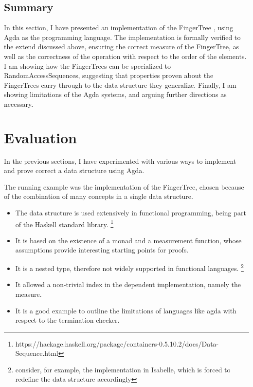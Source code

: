 \documentclass[12pt,twoside,notitlepage]{report}
\begin{document}
\section{Summary}
In this section, I have presented an implementation of the FingerTree \cite{fingertrees}, using Agda \cite{agdatutorial} as the programming language. The implementation is formally verified to the extend discussed above, ensuring the correct measure of the FingerTree, as well as the correctness of the operation with respect to the order of the elements. I am showing how the FingerTrees can be specialized to RandomAccessSequences, suggesting that properties proven about the FingerTrees carry through to the data structure they generalize. Finally, I am showing limitations of the Agda systems, and arguing further directions as necessary. 


\chapter{Evaluation}

In the previous sections, I have experimented with various ways to implement and prove correct a data structure using Agda. 

The running example was the implementation of the FingerTree, chosen because of the combination of many concepts in a single data structure.

\begin{itemize}
\item The data structure is used extensively in functional programming, being part of the Haskell standard library. \footnote{https://hackage.haskell.org/package/containers-0.5.10.2/docs/Data-Sequence.html}

\item It is based on the existence of a monad and a measurement function, whose assumptions provide interesting starting points for proofs.

\item It is a nested type, therefore not widely supported in functional languages. \footnote{consider, for example, the implementation in Isabelle, which is forced to redefine the data structure accordingly}

\item It allowed a non-trivial index in the dependent implementation, namely the measure.

\item It is a good example to outline the limitations of languages like agda with respect to the termination checker.
\end{itemize}
\end{document}
